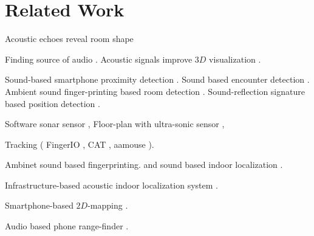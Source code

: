 \section{Related Work}\label{sec:related}
Acoustic echoes reveal room shape \cite{ranking_echoes,room_shape,echo_slam,bat_echo}

Finding source of audio \cite{audio_source}.
Acoustic signals improve $3D$ visualization \cite{geom_echo}.

Sound-based smartphone proximity detection \cite{sound_prox}. Sound based encounter detection \cite{dopenc}. Ambient sound finger-printing based room detection \cite{batphone_abs}. Sound-reflection signature based position detection \cite{echotag}. 

Software sonar sensor \cite{iot15}, Floor-plan with ultra-sonic sensor \cite{ccnc16},

Tracking ( FingerIO \cite{fingerio}, CAT \cite{cat}, aamouse \cite{aamouse}  \cite{audiogest}).

Ambinet sound based fingerprinting. \cite{soundsense, surroundsense} and sound based indoor localization \cite{soundloc, roomsense}.

Infrastructure-based acoustic indoor localization system \cite{assist, iphone_soundloc,beep,beepbeep,indoor_ambient,walrus}.

Smartphone-based $2D$-mapping \cite{iot15, iot16}.

Audio based phone range-finder \cite{phone_lidar}.



